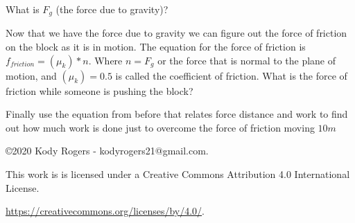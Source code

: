 \documentclass[12pt]{article}
\begin{document}
What is $F_g$ (the force due to gravity)?

\parbox[][10cm][t]{8cm}{}

Now that we have the force due to gravity we can figure out the force of friction on the block as it is in motion. The equation for the force of friction is $f_{friction} = (\mu_k) * n$. Where $n = F_g$ or the force that is normal to the plane of motion, and $(\mu_k) = 0.5$ is called the coefficient of friction. What is the force of friction while someone is pushing the block?

\parbox[][10cm][t]{8cm}{}

 Finally use the equation from before that relates force distance and work to find out how much work is done just to overcome the force of friction moving $10m$

\parbox[][10cm][t]{8cm}{}



\begin{flushleft}
    \copyright  2020 Kody Rogers - kodyrogers21@gmail.com.

    This work is is licensed under a Creative Commons Attribution 4.0 International License.

    \url{https://creativecommons.org/licenses/by/4.0/}.
\end{flushleft}

\end{document}
